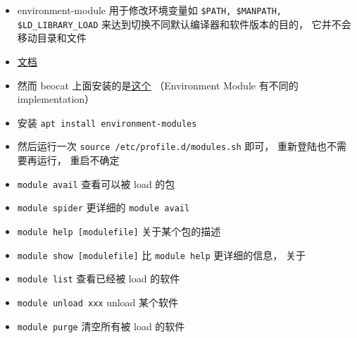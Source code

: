 
\begin{issues}
\issueDraft
\end{issues}

\begin{itemize}
\item environment-module 用于修改环境变量如 \verb`$PATH, $MANPATH, $LD_LIBRARY_LOAD` 来达到切换不同默认编译器和软件版本的目的， 它并不会移动目录和文件
\item \href{https://modules.readthedocs.io/en/latest/index.html}{文档}
\item 然而 beocat 上面安装的是\href{https://lmod.readthedocs.io/en/latest/index.html}{这个} （Environment Module 有不同的 implementation）
\item 安装 \verb`apt install environment-modules`
\item 然后运行一次 \verb`source /etc/profile.d/modules.sh` 即可， 重新登陆也不需要再运行， 重启不确定
\item \verb`module avail` 查看可以被 load 的包
\item \verb`module spider` 更详细的 \verb`module avail`
\item \verb`module help [modulefile]` 关于某个包的描述
\item \verb`module show [modulefile]` 比 \verb`module help` 更详细的信息， 关于
\item \verb`module list` 查看已经被 load 的软件
\item \verb`module unload xxx` unload 某个软件
\item \verb`module purge` 清空所有被 load 的软件
\end{itemize}

